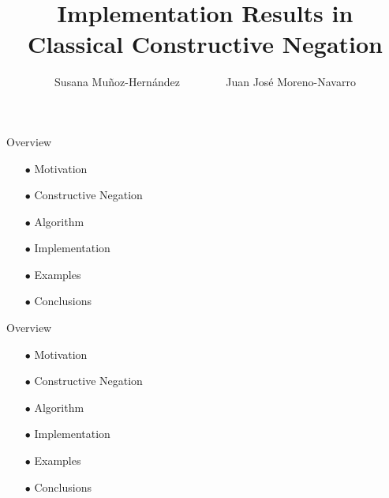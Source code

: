 \documentclass[pdf,slideColor,contemporain]{prosper}
\title{\black Implementation Results in Classical Constructive Negation}
\author{Susana Mu\~{n}oz-Hern\'{a}ndez ~~~~~~~ Juan Jos\'{e} Moreno-Navarro}
\begin{document}
\maketitle
\begin{slide}{Overview}
\vspace{0.8cm}
        \begin{itemize}
                \item[{\blue $\bullet$}] Motivation
                \item[{\blue $\bullet$}] Constructive Negation
                \item[{\blue $\bullet$}] Algorithm
                \item[{\blue $\bullet$}] Implementation
                \item[{\blue $\bullet$}] Examples
                \item[{\blue $\bullet$}] Conclusions
        \end{itemize}
\end{slide}

\begin{slide}{Overview}
\vspace{0.8cm}
        \begin{itemize}
                \item[$\bullet$] {\blue Motivation}
                \item[{\blue $\bullet$}] Constructive Negation
                \item[{\blue $\bullet$}] Algorithm
                \item[{\blue $\bullet$}] Implementation
                \item[{\blue $\bullet$}] Examples
                \item[{\blue $\bullet$}] Conclusions
        \end{itemize}
\end{slide}
\end{document}
